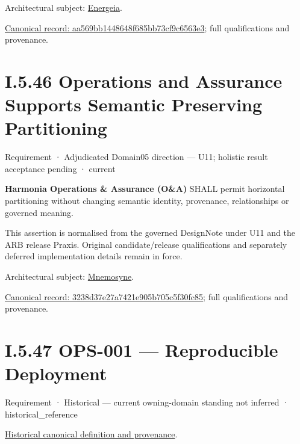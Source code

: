 Architectural subject: \hyperref[element:fb3f37a6ac614415ac486a6de9d35994]{Energeia}.


{\footnotesize \href{../../../../continuum/motivation/requirement/aa569bb1448648f685bb73cf9c6563e3.md}{Canonical record: aa569bb1448648f685bb73cf9c6563e3}; full qualifications and provenance.}\par
\section*{I.5.46 Operations and Assurance Supports Semantic Preserving Partitioning}
\label{navigation:I.5.46}

\label{element:3238d37e27a7421e905b705c5f30fc85}
{\small Requirement · Adjudicated Domain05 direction — U11; holistic result acceptance pending · current}\par

\textbf{Harmonia Operations \& Assurance (O\&A)} SHALL permit horizontal partitioning without changing semantic identity, provenance, relationships or governed meaning.



This assertion is normalised from the governed DesignNote under U11 and the ARB release Praxis. Original candidate/release qualifications and separately deferred implementation details remain in force.



Architectural subject: \hyperref[element:7985e647bf9e4ca3ba70faf9e3e4ae02]{Mnemosyne}.


{\footnotesize \href{../../../../continuum/motivation/requirement/3238d37e27a7421e905b705c5f30fc85.md}{Canonical record: 3238d37e27a7421e905b705c5f30fc85}; full qualifications and provenance.}\par
\section*{I.5.47 OPS-001 — Reproducible Deployment}
\label{navigation:I.5.47}

\label{element:c4373b1fd8444f10b502a5c3216152d7}
{\small Requirement · Historical — current owning-domain standing not inferred · historical\_reference}\par
\href{../../../../continuum/motivation/requirement/c4373b1fd8444f10b502a5c3216152d7.md}{Historical canonical definition and provenance}.\par

